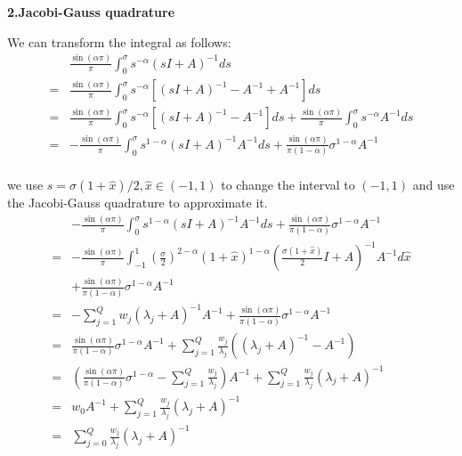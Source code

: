 \textbf{2.Jacobi-Gauss quadrature }

We can transform the integral as follows:
\begin{equation}
  \begin{aligned}
 &\frac{\sin(\alpha \pi)}{\pi}\int_0^{\sigma}s^{-\alpha}(s{I}+{A})^{-1}ds\\
 =&\frac{\sin(\alpha \pi)}{\pi}\int_0^{\sigma}s^{-\alpha}\left[(s{I}+{A})^{-1}-A^{-1}+A^{-1}\right]ds\\
 =&\frac{\sin(\alpha \pi)}{\pi}\int_0^{\sigma}s^{-\alpha}\left[(s{I}+{A})^{-1}-A^{-1}\right]ds+\frac{\sin(\alpha \pi)}{\pi}\int_0^{\sigma}s^{-\alpha}A^{-1}ds\\
= & -\frac{\sin(\alpha \pi)}{\pi}\int_0^{\sigma}s^{1-\alpha}(s{I}+{A})^{-1}A^{-1}ds+\frac{\sin(\alpha \pi)}{\pi(1-\alpha)}\sigma^{1-\alpha}A^{-1}\\
  \end{aligned}
\end{equation}

we use $s=\sigma(1+\hat{x})/2,\hat{x}\in (-1,1)$ to change the interval to $(-1, 1)$ and use the Jacobi-Gauss quadrature to approximate it.
\begin{equation}
  \begin{aligned}
& -\frac{\sin(\alpha \pi)}{\pi}\int_0^{\sigma}s^{1-\alpha}(s{I}+{A})^{-1}A^{-1}ds+\frac{\sin(\alpha \pi)}{\pi(1-\alpha)}\sigma^{1-\alpha}A^{-1}\\
=&-\frac{\sin(\alpha \pi)}{\pi}\int_{-1}^{1}\left(\frac{\sigma}{2}\right)^{2-\alpha}(1+\hat{x})^{1-\alpha}\left(\frac{\sigma(1+\hat{x})}{2}{I}+{A}\right)^{-1}A^{-1}d\hat{x}\\
& +\frac{\sin(\alpha \pi)}{\pi(1-\alpha)}\sigma^{1-\alpha}A^{-1}\\
=& -\sum_{j=1}^{Q}w_j(\lambda_j+A)^{-1}A^{-1}+\frac{\sin(\alpha \pi)}{\pi(1-\alpha)}\sigma^{1-\alpha}A^{-1}\\
=& \frac{\sin(\alpha \pi)}{\pi(1-\alpha)}\sigma^{1-\alpha}A^{-1}+\sum_{j=1}^{Q}\frac{w_j}{\lambda_j}\left((\lambda_j+A)^{-1}-A^{-1}\right)\\
=& \left(\frac{\sin(\alpha \pi)}{\pi(1-\alpha)}\sigma^{1-\alpha}-\sum_{j=1}^{Q}\frac{w_j}{\lambda_j}\right)A^{-1}+\sum_{j=1}^{Q}\frac{w_j}{\lambda_j}(\lambda_j+A)^{-1}\\
=& w_0 A^{-1}+\sum_{j=1}^{Q}\frac{w_j}{\lambda_j}(\lambda_j+A)^{-1}\\
=& \sum_{j=0}^{Q}\frac{w_j}{\lambda_j}(\lambda_j+A)^{-1}
  \end{aligned}
\end{equation}

